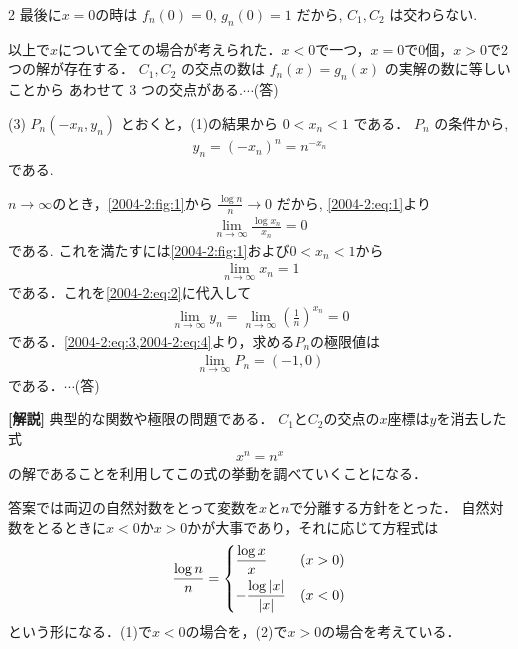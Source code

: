 \documentclass[../../main.tex]{subfiles}
\begin{document}
\begin{multicols}{2}
  最後に$x=0$の時は $f_n(0) = 0$, $g_n(0) = 1$ だから, $C_1, C_2$ は交わらない.

  以上で$x$について全ての場合が考えられた．$x<0$で一つ，$x=0$で0個，$x>0$で2つの解が存在する．
  $C_1, C_2$ の交点の数は $f_n(x) = g_n(x)$ の実解の数に等しいことから
  あわせて $3$ つの交点がある.$\cdots$(答)

  \vspace{10pt}
  (3) $P_n(-x_n, y_n)$ とおくと，(1)の結果から $0 < x_n < 1$ である．
  $P_n$ の条件から,
  \begin{align}
    y_n = (-x_n)^n = n^{-x_n} \label{2004-2:eq:2}
  \end{align}
  である.

  $n\to\infty$のとき，\cref{2004-2:fig:1}から $\frac{\log n}{n} \to 0$ だから,
  \cref{2004-2:eq:1}より
  \begin{align*}
    \lim_{n\to\infty} \frac{\log x_n}{x_n} = 0
  \end{align*}
  である. これを満たすには\cref{2004-2:fig:1}および$0<x_n<1$から
  \begin{align}
    \lim_{n\to\infty} x_n = 1 \label{2004-2:eq:3}
  \end{align}
  である．これを\cref{2004-2:eq:2}に代入して
  \begin{align}
    \lim_{n\to\infty} y_n = \lim_{n\to\infty} \left(\frac{1}{n}\right)^{x_n} = 0 \label{2004-2:eq:4}
  \end{align}
  である．\cref{2004-2:eq:3,2004-2:eq:4}より，求める$P_n$の極限値は
  \begin{align*}
    \lim_{n\to\infty}P_n = (-1,0)
  \end{align*}
  である．$\cdots$(答)

  \vspace{10pt}

  {\bf[解説]}
  典型的な関数や極限の問題である．
  $C_1$と$C_2$の交点の$x$座標は$y$を消去した式
  \begin{align*}
    x^{n} = n^{x}
  \end{align*}
  の解であることを利用してこの式の挙動を調べていくことになる．

  答案では両辺の自然対数をとって変数を$x$と$n$で分離する方針をとった．
  自然対数をとるときに$x<0$か$x>0$かが大事であり，それに応じて方程式は
  \begin{align*}
    \frac{\log n}{n} =
    \begin{dcases}
      \frac{\log x}{x}      & (x>0) \\
      -\frac{\log |x|}{|x|} & (x<0)
    \end{dcases}
  \end{align*}
  という形になる．(1)で$x<0$の場合を，(2)で$x>0$の場合を考えている．


\end{multicols}
\end{document}
